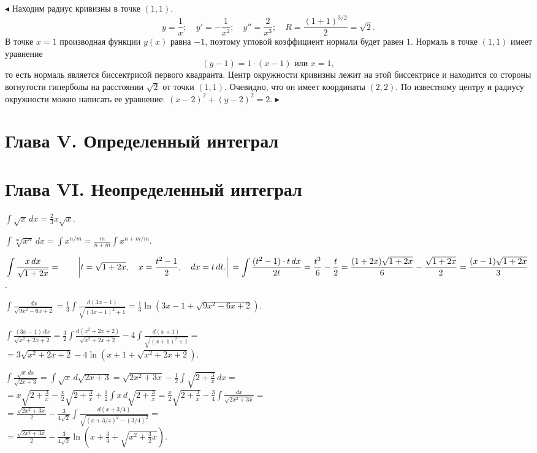 \documentclass[a5paper,10pt]{article}
\begin{document}
\smallskip
\noindent $\blacktriangleleft$ Находим радиус кривизны в точке $(1,1)$.
$$y=\frac1x;\quad y'=-\frac{1}{x^2};\quad
y''=\frac{2}{x^3};\quad R=\frac{(1+1)^{3/2}}{2}=\sqrt2.$$
В точке $x=1$ производная функции $y(x)$ равна $-1$, поэтому угловой коэффициент
нормали будет равен $1$. Нормаль в точке $(1,1)$ имеет уравнение
$$(y-1)=1\cdot(x-1)\mbox{ или }x=1,$$ то есть нормаль является биссектрисой
первого квадранта. Центр окружности кривизны лежит на этой биссектрисе и
находится  со стороны вогнутости гиперболы на расстоянии $\sqrt2$ от точки $(1,1)$.
Очевидно, что он имеет координаты $(2,2)$. По известному центру и радиусу
окружности можно написать ее уравнение: $(x-2)^2+(y-2)^2=2$. $\blacktriangleright$

\medskip
\section* {Глава V. Определенный интеграл}

\medskip
\section* {Глава VI. Неопределенный интеграл}

\medskip
\noindent

\medskip
{} $\displaystyle\int\sqrt x\,dx=\frac23x\sqrt x.$

\medskip
{} $\displaystyle\int\sqrt[m]{x^n}\,dx=\int x^{n/m}=
\frac{m}{n+m}\int x^{{n+m}/m}.$

\medskip
{} $\displaystyle\int\frac{x\,dx}{\sqrt{1+2x}}=
\qquad\left|t=\sqrt{1+2x},\quad x=
\frac{t^2-1}{2},\quad dx=t\,dt.\right|\\
=\int\frac{(t^2-1)\cdot t\,dx}{2t}=\frac{t^3}{6}-\frac t2=
\frac{(1+2x)\sqrt{1+2x}}{6}-\frac{\sqrt{1+2x}}{2}=
\frac{(x-1)\sqrt{1+2x}}{3}$.

\medskip
{} $\displaystyle\int\frac{dx}{\sqrt{9x^2-6x+2}}=
\frac13\int\frac{d(3x-1)}{\sqrt{(3x-1)^2+1}}=\frac13\ln(3x-1+\sqrt{9x^2-6x+2})$.

\medskip
{} $\displaystyle\int\frac{(3x-1)\,dx}{\sqrt{x^2+2x+2}}=
\frac32\int\frac{d(x^2+2x+2)}{\sqrt{x^2+2x+2}}-
4\int\frac{d(x+1)}{\sqrt{(x+1)^2+1}}=$\\
$\displaystyle =3\sqrt{x^2+2x+2}-4\ln(x+1+\sqrt{x^2+2x+2})$.

\medskip
{} $\displaystyle\int\frac{\sqrt x\,dx}{\sqrt{2x+3}}=\int\sqrt x\,d\sqrt{2x+3}=
\sqrt{2x^2+3x}-\frac12\int\sqrt{2+\frac3x}\,dx=$\\
$\displaystyle =x\sqrt{2+\frac3x}-\frac x2\sqrt{2+\frac3x}+\frac12\int x\,d\sqrt{2+\frac3x}=
\frac x2\sqrt{2+\frac3x}-\frac34\int \frac{dx}{\sqrt{2x^2+3x}}=$\\
$\displaystyle =\frac{\sqrt{2x^2+3x}}{2}-
\frac{3}{4\sqrt2}\int\frac{d(x+3/4)}{\sqrt{(x+3/4)^2-(3/4)^2}}=$\\
$\displaystyle =\frac{\sqrt{2x^2+3x}}{2}-
\frac{3}{4\sqrt2}\ln\left(x+\frac34+\sqrt{x^2+\frac32x}\right)$.
\end{document}
